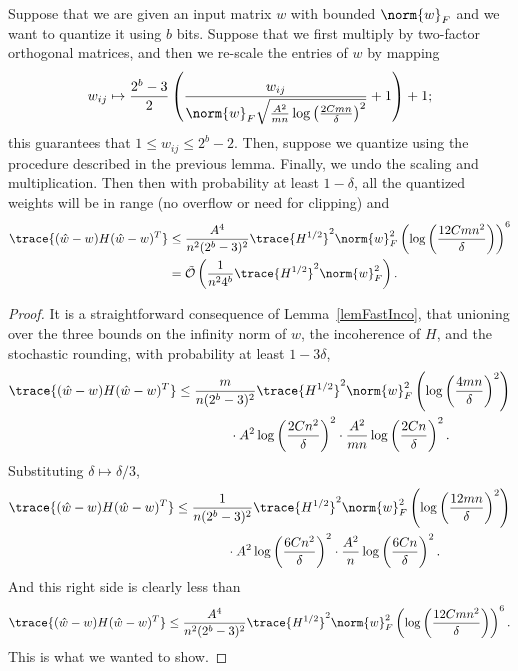 \begin{toappendix}
\begin{theorem}
Suppose that we are given an input matrix $w$ with bounded $\norm{w}_{F}$ and we want to quantize it using $b$ bits. Suppose that we first multiply by two-factor orthogonal matrices, and then we re-scale the entries of $w$ by mapping
\[
	w_{ij} \mapsto \frac{2^b - 3}{2} \left( \frac{w_{ij}}{\norm{w}_F \sqrt{ \frac{A^2}{mn} \log\left( \frac{2C m n}{\delta} \right)^2 }} + 1 \right) + 1;
\]
this guarantees that $1 \le w_{ij} \le 2^b - 2$. Then, suppose we quantize using the procedure described in the previous lemma. Finally, we undo the scaling and multiplication. Then then with probability at least $1 - \delta$, all the quantized weights will be in range (no overflow or need for clipping) and
\begin{align*}
	\trace{ (\hat w - w) H (\hat w - w)^T } &\le \frac{A^4}{n^2 (2^b - 3)^2} \trace{H^{1/2}}^2 \norm{w}_{F}^2 \left( \log\left( \frac{12 C m n^2}{\delta}\right) \right)^6
	\\&=
	\tilde{\mathcal{O}}\left( \frac{1}{n^2 4^b} \trace{H^{1/2}}^2 \norm{w}_{F}^2 \right).
\end{align*}
\end{theorem}
\begin{proof}
It is a straightforward consequence of Lemma~\ref{lemFastInco}, that unioning over the three bounds on the infinity norm of $w$, the incoherence of $H$, and the stochastic rounding, with probability at least $1 - 3 \delta$,
\begin{align*}
\trace{ (\hat w - w) H (\hat w - w)^T } &\le \frac{m}{n (2^b - 3)^2} \trace{H^{1/2}}^2 \norm{w}_{F}^2 \left( \log\left( \frac{4 mn}{\delta}\right)^2 \right) \\&\hspace{4em}\cdot A^2 \log\left(\frac{2 C n^2}{\delta}\right)^2 \cdot  \frac{A^2}{mn} \log\left( \frac{2 C n}{\delta} \right)^2.
\end{align*}
Substituting $\delta \mapsto \delta/3$, 
\begin{align*}
	\trace{ (\hat w - w) H (\hat w - w)^T } &\le \frac{1}{n (2^b - 3)^2} \trace{H^{1/2}}^2 \norm{w}_{F}^2 \left( \log\left( \frac{12 mn}{\delta}\right)^2 \right) \\&\hspace{4em}\cdot A^2 \log\left(\frac{6 C n^2}{\delta}\right)^2 \cdot  \frac{A^2}{n} \log\left( \frac{6 C n}{\delta} \right)^2.
\end{align*}
And this right side is clearly less than
\[
	\trace{ (\hat w - w) H (\hat w - w)^T } \le \frac{A^4}{n^2 (2^b - 3)^2} \trace{H^{1/2}}^2 \norm{w}_{F}^2 \left( \log\left( \frac{12 C m n^2}{\delta}\right) \right)^6.
\]
This is what we wanted to show.
\end{proof}


\end{toappendix}

